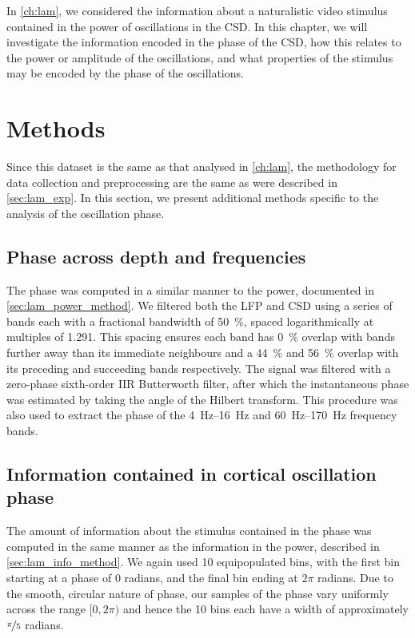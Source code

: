 
In \autoref{ch:lam}, we considered the information about a naturalistic video stimulus contained in the power of oscillations in the \ac{CSD}.
In this chapter, we will investigate the information encoded in the phase of the \ac{CSD}, how this relates to the power or amplitude of the oscillations, and what properties of the stimulus may be encoded by the phase of the oscillations.


\section{Methods}

Since this dataset is the same as that analysed in \autoref{ch:lam}, the methodology for data collection and preprocessing are the same as were described in \autoref{sec:lam_exp}.
In this section, we present additional methods specific to the analysis of the oscillation phase.


\subsection{Phase across depth and frequencies}
\label{sec:lam_phase_method}

The phase was computed in a similar manner to the power, documented in \autoref{sec:lam_power_method}.
We filtered both the \ac{LFP} and \ac{CSD} using a series of bands each with a fractional bandwidth of \SI{50}{\percent}, spaced logarithmically at multiples of \num{1.291}.
This spacing ensures each band has \SI{0}{\percent} overlap with bands further away than its immediate neighbours and a \SI{44}{\percent} and \SI{56}{\percent} overlap with its preceding and succeeding bands respectively.
The signal was filtered with a zero-phase sixth-order \ac{IIR} Butterworth filter, after which the instantaneous phase was estimated by taking the angle of the Hilbert transform.
This procedure was also used to extract the phase of the \SIrange{4}{16}{Hz} and \SIrange{60}{170}{Hz} frequency bands.


\subsection{Information contained in cortical oscillation phase}

The amount of information about the stimulus contained in the phase was computed in the same manner as the information in the power, described in \autoref{sec:lam_info_method}.
We again used \num{10} equipopulated bins, with the first bin starting at a phase of $0$ radians, and the final bin ending at $2\pi$ radians.
Due to the smooth, circular nature of phase, our samples of the phase vary uniformly across the range $[0, 2\pi)$ and hence the \num{10} bins each have a width of approximately $\nicefrac{\pi}{5}$ radians.

